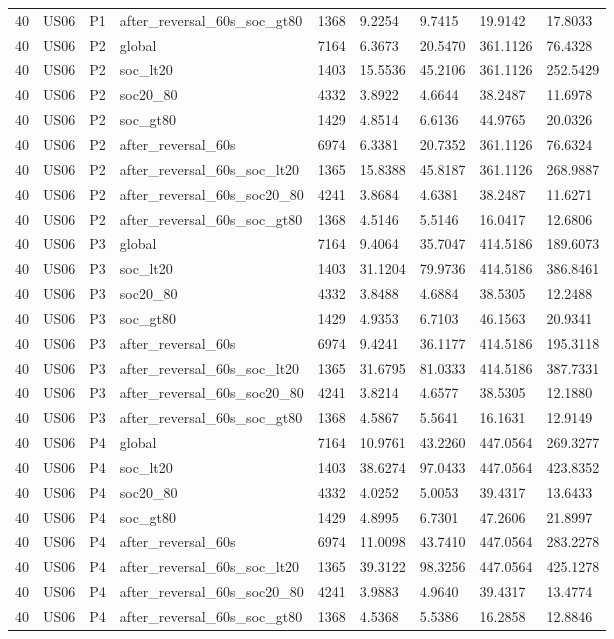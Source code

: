 \begin{tabular}{lllllllll}
40 & US06 & P1 & after\_reversal\_60s\_soc\_gt80 & 1368 & 9.2254 & 9.7415 & 19.9142 & 17.8033 \\
40 & US06 & P2 & global & 7164 & 6.3673 & 20.5470 & 361.1126 & 76.4328 \\
40 & US06 & P2 & soc\_lt20 & 1403 & 15.5536 & 45.2106 & 361.1126 & 252.5429 \\
40 & US06 & P2 & soc20\_80 & 4332 & 3.8922 & 4.6644 & 38.2487 & 11.6978 \\
40 & US06 & P2 & soc\_gt80 & 1429 & 4.8514 & 6.6136 & 44.9765 & 20.0326 \\
40 & US06 & P2 & after\_reversal\_60s & 6974 & 6.3381 & 20.7352 & 361.1126 & 76.6324 \\
40 & US06 & P2 & after\_reversal\_60s\_soc\_lt20 & 1365 & 15.8388 & 45.8187 & 361.1126 & 268.9887 \\
40 & US06 & P2 & after\_reversal\_60s\_soc20\_80 & 4241 & 3.8684 & 4.6381 & 38.2487 & 11.6271 \\
40 & US06 & P2 & after\_reversal\_60s\_soc\_gt80 & 1368 & 4.5146 & 5.5146 & 16.0417 & 12.6806 \\
40 & US06 & P3 & global & 7164 & 9.4064 & 35.7047 & 414.5186 & 189.6073 \\
40 & US06 & P3 & soc\_lt20 & 1403 & 31.1204 & 79.9736 & 414.5186 & 386.8461 \\
40 & US06 & P3 & soc20\_80 & 4332 & 3.8488 & 4.6884 & 38.5305 & 12.2488 \\
40 & US06 & P3 & soc\_gt80 & 1429 & 4.9353 & 6.7103 & 46.1563 & 20.9341 \\
40 & US06 & P3 & after\_reversal\_60s & 6974 & 9.4241 & 36.1177 & 414.5186 & 195.3118 \\
40 & US06 & P3 & after\_reversal\_60s\_soc\_lt20 & 1365 & 31.6795 & 81.0333 & 414.5186 & 387.7331 \\
40 & US06 & P3 & after\_reversal\_60s\_soc20\_80 & 4241 & 3.8214 & 4.6577 & 38.5305 & 12.1880 \\
40 & US06 & P3 & after\_reversal\_60s\_soc\_gt80 & 1368 & 4.5867 & 5.5641 & 16.1631 & 12.9149 \\
40 & US06 & P4 & global & 7164 & 10.9761 & 43.2260 & 447.0564 & 269.3277 \\
40 & US06 & P4 & soc\_lt20 & 1403 & 38.6274 & 97.0433 & 447.0564 & 423.8352 \\
40 & US06 & P4 & soc20\_80 & 4332 & 4.0252 & 5.0053 & 39.4317 & 13.6433 \\
40 & US06 & P4 & soc\_gt80 & 1429 & 4.8995 & 6.7301 & 47.2606 & 21.8997 \\
40 & US06 & P4 & after\_reversal\_60s & 6974 & 11.0098 & 43.7410 & 447.0564 & 283.2278 \\
40 & US06 & P4 & after\_reversal\_60s\_soc\_lt20 & 1365 & 39.3122 & 98.3256 & 447.0564 & 425.1278 \\
40 & US06 & P4 & after\_reversal\_60s\_soc20\_80 & 4241 & 3.9883 & 4.9640 & 39.4317 & 13.4774 \\
40 & US06 & P4 & after\_reversal\_60s\_soc\_gt80 & 1368 & 4.5368 & 5.5386 & 16.2858 & 12.8846 \\
\hline
\end{tabular}

